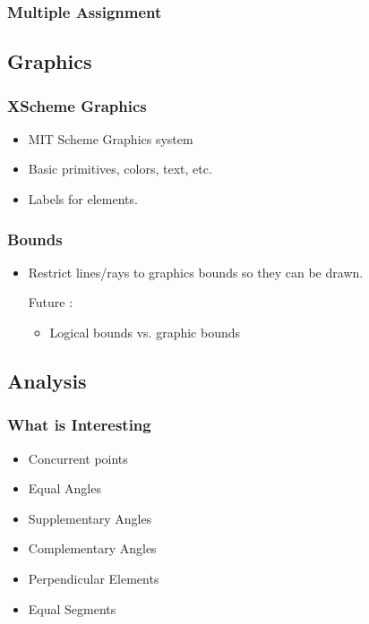 \documentclass[11pt]{article}
\begin{document}
\subsubsection{Multiple Assignment}
\label{sec-3-6-2}
\subsection{Graphics}
\label{sec-3-7}
\subsubsection{XScheme Graphics}
\label{sec-3-7-1}

\begin{itemize}
\item MIT Scheme Graphics system
\item Basic primitives, colors, text, etc.
\item Labels for elements.
\end{itemize}
\subsubsection{Bounds}
\label{sec-3-7-2}

\begin{itemize}
\item Restrict lines/rays to graphics bounds so they can be drawn.
\item[Future]:
\begin{itemize}
\item Logical bounds vs. graphic bounds
\end{itemize}
\end{itemize}
\subsection{Analysis}
\label{sec-3-8}
\subsubsection{What is Interesting}
\label{sec-3-8-1}

\begin{itemize}
\item Concurrent points
\item Equal Angles
\item Supplementary Angles
\item Complementary Angles
\item Perpendicular Elements
\item Equal Segments
\end{itemize}
\end{document}

